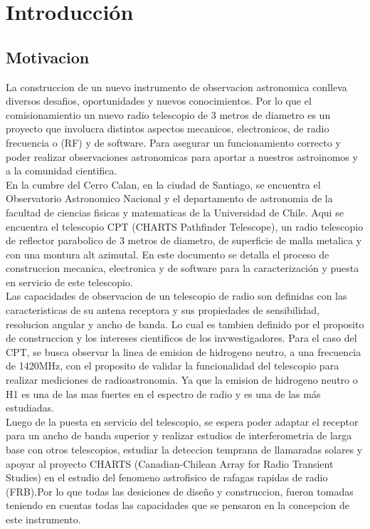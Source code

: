 \chapter{Introducción}
\section{Motivacion}

La construccion de un nuevo instrumento de observacion astronomica conlleva diversos desafios, oportunidades y nuevos conocimientos. Por lo que el comisionamientio un nuevo radio telescopio de 3 metros de diametro es un proyecto que involucra distintos aspectos mecanicos, electronicos, de radio frecuencia o (RF) y de software. Para asegurar un funcionamiento correcto y poder realizar observaciones astronomicas para aportar a nuestros astroinomos y a la comunidad cientifica.\\

En la cumbre del Cerro Calan, en la ciudad de Santiago, se encuentra el Observatorio Astronomico Nacional y el departamento de astronomia de la facultad de ciencias fisicas y matematicas de la Universidad de Chile. Aqui se encuentra el telescopio CPT (CHARTS Pathfinder Telescope), un radio telescopio de reflector parabolico de 3 metros de diametro, de superficie de malla metalica y con una montura alt azimutal. En este documento se detalla el proceso de construccion mecanica, electronica y de software para la caracterización y puesta en servicio de este telescopio.\\ 

Las capacidades de observacion de un telescopio de radio son definidas con las caracteristicas de su antena receptora y sus propiedades de sensibilidad, resolucion angular y ancho de banda. Lo cual es tambien definido por el proposito de construccion y los intereses cientificos de los invwestigadores. Para el caso del CPT, se busca observar la linea de emision de hidrogeno neutro, a una frecuencia de 1420MHz, con el proposito de validar la funcionalidad del telescopio para realizar mediciones de radioastronomia. Ya que la emision de hidrogeno neutro o H1 es una de las mas fuertes en el espectro de radio y es una de las más estudiadas.\\

Luego de la puesta en servicio del telescopio, se espera poder adaptar el receptor para un ancho de banda superior y realizar estudios de interferometria de larga base con otros telescopios, estudiar la deteccion temprana de llamaradas solares y apoyar al proyecto CHARTS (Canadian-Chilean Array for Radio Transient Studies) en el estudio del fenomeno astrofisico de rafagas rapidas de radio (FRB).Por lo que todas las desiciones de diseño y construccion, fueron tomadas teniendo en cuentas todas las capacidades que se pensaron en la concepcion de este instrumento.\\

